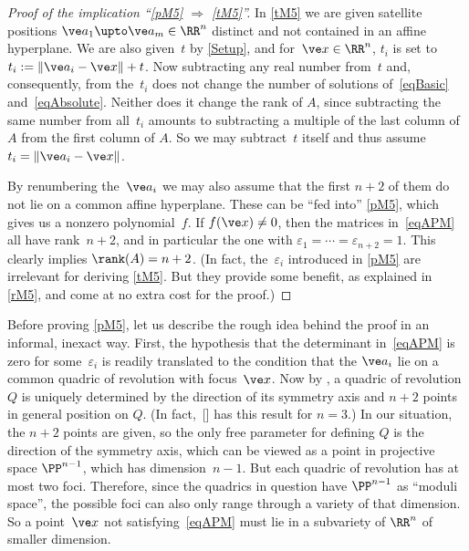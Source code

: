 \documentclass[reqno]{amsart}
\begin{document}
\begin{proof}[Proof of the implication ``\cref{pM5} $\Rightarrow$
  \cref{tM5}'']
  In \cref{tM5} we are given satellite positions $\ve a_1 \upto \ve a_m \in \RR^n$
  distinct and not contained in an affine hyperplane. We are also
  given~$t$ by \cref{Setup}, and for~$\ve x \in \RR^n$, $t_i$ is set
  to $t_i := \lVert\ve a_i - \ve x\rVert + t$. Now subtracting any
  real number from~$t$ and, consequently, from the~$t_i$ does not
  change the number of solutions of~\eqref{eqBasic}
  and~\eqref{eqAbsolute}. Neither does it change the rank of $A$,
  since subtracting the same number from all~$t_i$ amounts to
  subtracting a multiple of the last column of $A$ from the first
  column of $A$. So we may subtract~$t$ itself and thus assume
  $t_i = \lVert\ve a_i - \ve x\rVert$.

  By renumbering the~$\ve a_i$ we may also assume that the first
  $n + 2$ of them do not lie on a common affine hyperplane. These can
  be ``fed into'' \cref{pM5}, which gives us a nonzero
  polynomial~$f$. If $f(\ve x) \ne 0$, then the matrices
  in~\eqref{eqAPM} all have rank~$n + 2$, and in particular the one
  with $\varepsilon_1 = \cdots = \varepsilon_{n+2} = 1$. This clearly
  implies $\rank(A) = n + 2$. (In fact, the~$\varepsilon_i$ introduced
  in \cref{pM5} are irrelevant for deriving \cref{tM5}. But they
  provide some benefit, as explained in \cref{rM5}, and come at no
  extra cost for the proof.)
\end{proof}

Before proving \cref{pM5}, let us describe the rough idea behind the
proof in an informal, inexact way. First, the hypothesis that the
determinant in~\eqref{eqAPM} is zero for some~$\varepsilon_i$ is
readily translated to the condition that the $\ve a_i$ lie on a common
quadric of revolution with focus~$\ve x$. Now by
, a quadric of revolution $Q$ is
uniquely determined by the direction of its symmetry axis and $n + 2$
points in general position on $Q$. (In
fact,~[] has this result for
$n = 3$.) In our situation, the $n + 2$ points are given, so the only
free parameter for defining $Q$ is the direction of the symmetry axis,
which can be viewed as a point in projective space $\PP^{n - 1}$,
which has dimension~$n-1$. But each quadric of revolution has at most
two foci. Therefore, since the quadrics in question have $\PP^{n-1}$
as ``moduli space'', the possible foci can also only range through a
variety of that dimension. So a point~$\ve x$ not
satisfying~\eqref{eqAPM} must lie in a subvariety of $\RR^n$ of
smaller dimension.
\end{document}
